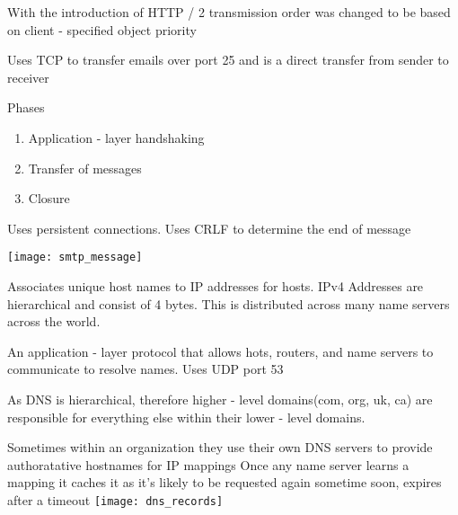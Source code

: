 \documentclass[12pt] {report}
\begin{document}
With the introduction of HTTP / 2 transmission order was changed to be based on client - specified object priority
{
    Uses TCP to transfer emails over port 25 and is a direct transfer from sender to receiver

    Phases
    \begin{enumerate}
    \item Application - layer handshaking
    \item Transfer of messages
    \item Closure
    \end{enumerate}
    Uses persistent connections. Uses CRLF to determine the end of message

    \texttt{[image: smtp\_message]}

}
{

    Associates unique host names to IP addresses for hosts. IPv4 Addresses are hierarchical and consist of 4 bytes. This is distributed across many name servers across the world.

    An application - layer protocol that allows hots, routers, and name servers to communicate to resolve names. Uses UDP port 53

    As DNS is hierarchical, therefore higher - level domains(com, org, uk, ca)
        are responsible for everything else
            within their lower - level domains.

            Sometimes within an organization they use their own DNS servers to provide authoratative hostnames for IP mappings
Once any name server learns a mapping it caches it as it's likely to be requested again sometime soon, expires after a timeout
\texttt{[image: dns\_records]}
}
\
\end{document}
